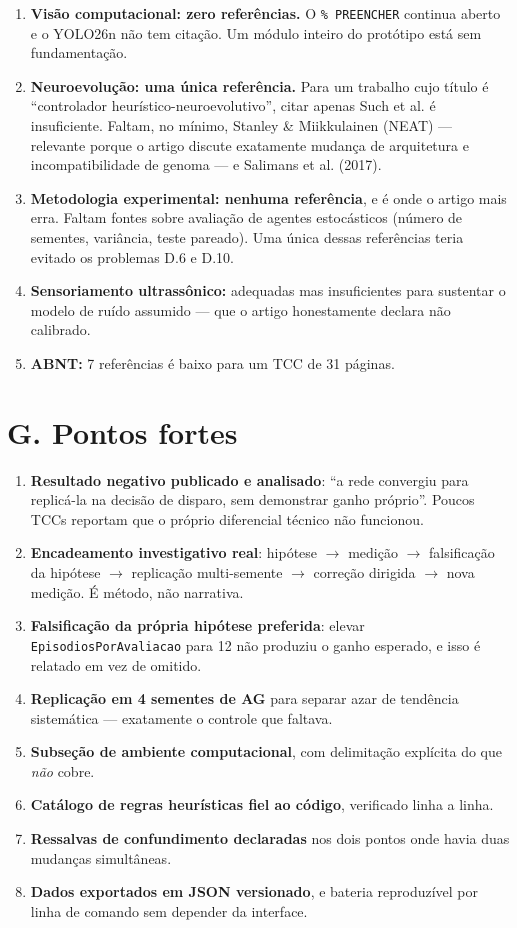 \documentclass[11pt,a4paper]{article}
\begin{document}
\begin{enumerate}
  \item \textbf{Visão computacional: zero referências.} O \texttt{\% PREENCHER} continua aberto e o
  YOLO26n não tem citação. Um módulo inteiro do protótipo está sem fundamentação.
  \item \textbf{Neuroevolução: uma única referência.} Para um trabalho cujo título é ``controlador
  heurístico-neuroevolutivo'', citar apenas Such et al. é insuficiente. Faltam, no mínimo, Stanley \&
  Miikkulainen (NEAT) --- relevante porque o artigo discute exatamente mudança de arquitetura e
  incompatibilidade de genoma --- e Salimans et al. (2017).
  \item \textbf{Metodologia experimental: nenhuma referência}, e é onde o artigo mais erra. Faltam
  fontes sobre avaliação de agentes estocásticos (número de sementes, variância, teste pareado). Uma
  única dessas referências teria evitado os problemas D.6 e D.10.
  \item \textbf{Sensoriamento ultrassônico:} adequadas mas insuficientes para sustentar o modelo de
  ruído assumido --- que o artigo honestamente declara não calibrado.
  \item \textbf{ABNT:} 7 referências é baixo para um TCC de 31 páginas.
\end{enumerate}

\section*{G. Pontos fortes}

\begin{enumerate}
  \item \textbf{Resultado negativo publicado e analisado}: ``a rede convergiu para replicá-la na
  decisão de disparo, sem demonstrar ganho próprio''. Poucos TCCs reportam que o próprio diferencial
  técnico não funcionou.
  \item \textbf{Encadeamento investigativo real}: hipótese $\rightarrow$ medição $\rightarrow$
  falsificação da hipótese $\rightarrow$ replicação multi-semente $\rightarrow$ correção dirigida
  $\rightarrow$ nova medição. É método, não narrativa.
  \item \textbf{Falsificação da própria hipótese preferida}: elevar \texttt{EpisodiosPorAvaliacao}
  para 12 não produziu o ganho esperado, e isso é relatado em vez de omitido.
  \item \textbf{Replicação em 4 sementes de AG} para separar azar de tendência sistemática ---
  exatamente o controle que faltava.
  \item \textbf{Subseção de ambiente computacional}, com delimitação explícita do que \emph{não}
  cobre.
  \item \textbf{Catálogo de regras heurísticas fiel ao código}, verificado linha a linha.
  \item \textbf{Ressalvas de confundimento declaradas} nos dois pontos onde havia duas mudanças
  simultâneas.
  \item \textbf{Dados exportados em JSON versionado}, e bateria reproduzível por linha de comando sem
  depender da interface.
\end{enumerate}
\end{document}

